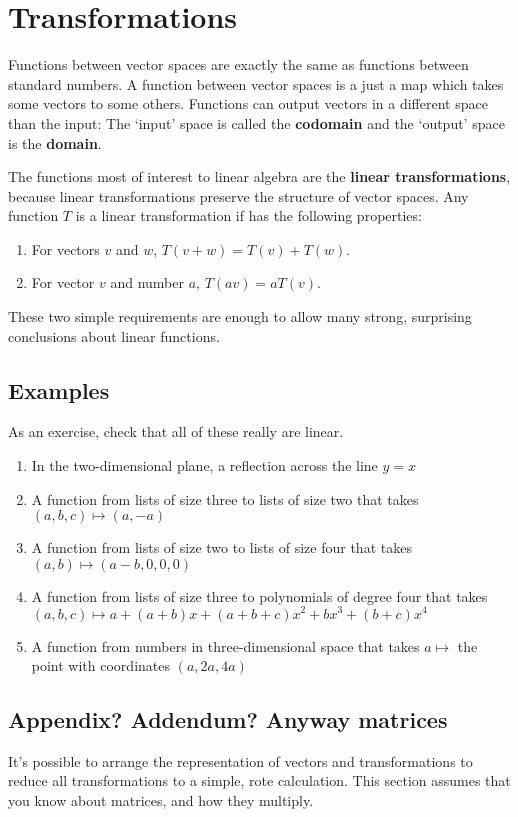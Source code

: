 \documentclass{article}
\begin{document}
    \section{Transformations}
        Functions between vector spaces are exactly the same as functions between standard numbers. A function between vector spaces is a just a map which takes some vectors to some others. Functions can output vectors in a different space than the input: The `input' space is called the \textbf{codomain} and the `output' space is the \textbf{domain}.

        The functions most of interest to linear algebra are the \textbf{linear transformations}, because linear transformations preserve the structure of vector spaces. Any function $T$ is a linear transformation if has the following properties:
        \begin{enumerate}
            \item For vectors $v$ and $w$, $T(v+w) = T(v) + T(w)$.
            \item For vector $v$ and number $a$, $T(av) = aT(v)$.
        \end{enumerate}
        These two simple requirements are enough to allow many strong, surprising conclusions about linear functions. 
        \subsection{Examples}
            As an exercise, check that all of these really are linear.
            \begin{enumerate}
                \item In the two-dimensional plane, a reflection across the line $y = x$
                \item A function from lists of size three to lists of size two that takes $(a, b, c) \mapsto (a, -a)$ 
                \item A function from lists of size two to lists of size four that takes $(a, b) \mapsto (a-b, 0, 0, 0)$ 
                \item A function from lists of size three to polynomials of degree four that takes $(a, b, c) \mapsto a + (a+b)x + (a+b+c)x^2 + bx^3 + (b+c)x^4$
                \item A function from numbers in three-dimensional space that takes $a \mapsto$ the point with coordinates $(a, 2a, 4a)$
            \end{enumerate}
        \subsection{Appendix? Addendum? Anyway matrices}
            It's possible to arrange the representation of vectors and transformations to reduce all transformations to a simple, rote calculation. This section assumes that you know about matrices, and how they multiply. 
\end{document}
